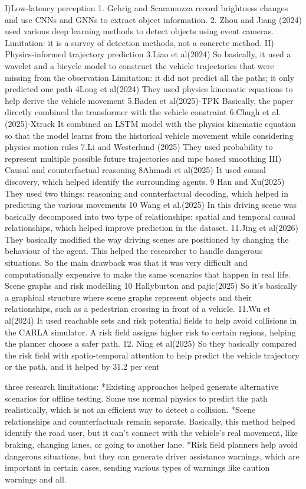 \documentclass{article}
\begin{document}
I)Low-latency perception
1. Gehrig and Scaramuzza record brightness changes and use CNNs and GNNs to extract object information.
2. Zhou and Jiang (2024) used various deep learning methods to detect objects using event cameras. Limitation: it is a survey of detection methods, not a concrete method.
II) Physics-informed trajectory prediction
3.Liao et al(2024)
So basically, it used a wavelet and a bicycle model to construct the vehicle trajectories that were missing from the observation
Limitation: it did not predict all the paths; it only predicted one path
4Long et al(2024)
They used physics kinematic equations to help derive the vehicle movement
5.Baden et al(2025)-TPK
Basically, the paper directly combined the transformer with the vehicle constraint 
6.Chugh et al. (2025)-Xtrack
It combined an LSTM model with the physics kinematic equation so that the model learns from the historical vehicle movement while considering physics motion rules
7.Li and Westerlund (2025)
They used probability to represent multiple possible future trajectories and mpc based smoothing 
III) Causal and counterfactual reasoning
8Ahmadi et al(2025)
It used causal discovery, which helped identify the surrounding agents.
9 Han and Xu(2025)
They used two things: reasoning and counterfactual decoding, which helped in predicting the various movements
10 Wang et al.(2025)
In this driving scene was basically decomposed into two type of relationships: spatial and temporal causal relationships, which helped improve prediction in the dataset.
11.Jing et al(2026)
They basically modified the way driving scenes are positioned by changing the behaviour of the agent. This helped the researcher to handle dangerous situations.
So the main drawback was that it was very difficult and computationally expensive to make the same scenarios that happen in real life.
Scene graphs and risk modelling
10 Hallyburton and pajic(2025)
So it's basically a graphical structure where scene graphs represent objects and their relationships, such as a pedestrian crossing in front of a vehicle.
11.Wu et al(2024)
It used reachable sets and risk potential fields to help avoid collisions in the CARLA simulator. A risk field assigns higher risk to certain regions, helping the planner choose a safer path.
12. Ning et al(2025)
So they basically compared the risk field with spatio-temporal attention to help predict the vehicle trajectory or the path, and it helped by 31.2 per cent 

three research limitations:
*Existing approaches helped generate alternative scenarios for offline testing. Some use normal physics to predict the path realistically, which is not an efficient way to detect a collision.
*Scene relationships and counterfactuals remain separate. Basically, this method helped identify the road user, but it can't connect with the vehicle's real movement, like braking, changing lanes, or going to another lane.
*Risk field planners help avoid dangerous situations, but they can generate driver assistance warnings, which are important in certain cases, sending various types of warnings like caution warnings and all.
\end{document}

